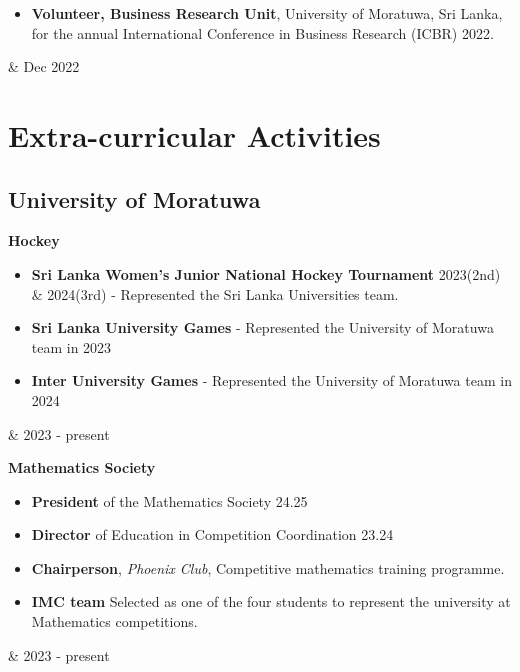 \documentclass[10pt, a4paper]{article}
\newenvironment{highlights}{
        \begin{itemize}[
                topsep=0pt,
                parsep=0.10 cm,
                partopsep=0pt,
                itemsep=0pt,
                after=\vspace{-1\baselineskip},
                leftmargin=0.4 cm + 3pt
            ]
    }{
        \end{itemize}
    } %
\let\originalTabularx\tabularx
\let\originalEndTabularx\endtabularx
\renewenvironment{tabularx}{\bgroup\centering\originalTabularx}{\originalEndTabularx\par\egroup}
\begin{document}
	\begin{tabularx}{
            \textwidth-0.4 cm-0.13cm
        }{
            K{0.2 cm}
            R{4.1 cm}
        }
            \begin{highlights}
			\item \textbf{Volunteer, Business Research Unit}, University of Moratuwa, Sri Lanka, for the annual International Conference in Business Research (ICBR) 2022. \end{highlights}
            &
            Dec 2022
        \end{tabularx}

     \section{Extra-curricular Activities}
	\subsection{University of Moratuwa}
	
	
		\begin{tabularx}{\textwidth-0.4 cm-0.13cm}{K{0.2 cm} R{4.1 cm}}
            \textbf{Hockey}
            \vspace{0.10 cm}
             \begin{highlights}
	        \item \textbf{Sri Lanka Women's Junior National Hockey Tournament} 2023(2nd) \& 2024(3rd) - Represented the Sri Lanka Universities team.
	        \item \textbf{Sri Lanka University Games} - Represented the University of Moratuwa team in 2023
	        \item \textbf{Inter University Games} - Represented the University of Moratuwa team in 2024
	        \end{highlights}
            &
            2023 - present
           \end{tabularx}
           
           
	\vspace{0.2 cm}	
		\begin{tabularx}{\textwidth-0.4 cm-0.13cm}{K{0.2 cm} R{4.1 cm}}
            \textbf{Mathematics Society}
            \vspace{0.10 cm}
            \begin{highlights}                
            	\item \textbf{President} of the Mathematics Society 24.25
                \item \textbf{Director} of Education in Competition Coordination 23.24
                \item \textbf{Chairperson}, \textit{Phoenix Club}, Competitive mathematics training
 programme. 
 			\item \textbf{IMC team} Selected as one of the four students to represent the university at Mathematics competitions.
 		\end{highlights}
            &
            2023 - present
           \end{tabularx}
			
\end{document}
